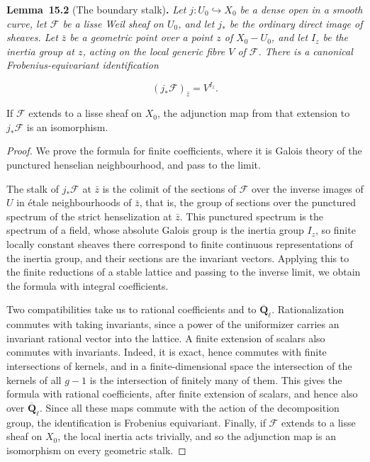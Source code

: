 \documentclass[11pt]{article}
\newenvironment{bpstatement}[2]{\par\addvspace{0.6\baselineskip}\noindent\textbf{#1}#2\textbf{.}\enspace\ignorespaces}
  {\par\addvspace{0.4\baselineskip}}
\newenvironment{bpstatementit}[2]{\begin{bpstatement}{#1}{#2}\itshape\ignorespaces}{\end{bpstatement}}
\begin{document}
\label{bp127}%
\begin{bpstatementit}{Lemma~15.2}{ (The boundary stalk)}
Let \(j:U_0\hookrightarrow X_0\) be a dense open in a smooth curve, let \(\mathcal F\) be a lisse Weil sheaf on \(U_0\), and let \(j_*\) be the ordinary direct image of sheaves. Let \(\bar z\) be a geometric point over a point \(z\) of \(X_0-U_0\), and let \(I_z\) be the inertia group at \(z\), acting on the local generic fibre \(V\) of \(\mathcal F\). There is a canonical Frobenius-equivariant identification

\[
(j_*\mathcal F)_{\bar z}=V^{I_z}.
\]

If \(\mathcal F\) extends to a lisse sheaf on \(X_0\), the adjunction map from that extension to \(j_*\mathcal F\) is an isomorphism.
\end{bpstatementit}

\begin{proof}[{Proof}]\label{bp128}%
We prove the formula for finite coefficients, where it is Galois theory of the punctured henselian neighbourhood, and pass to the limit.

The stalk of \(j_*\mathcal F\) at \(\bar z\) is the colimit of the sections of \(\mathcal F\) over the inverse images of \(U\) in étale neighbourhoods of \(\bar z\), that is, the group of sections over the punctured spectrum of the strict henselization at \(\bar z\). This punctured spectrum is the spectrum of a field, whose absolute Galois group is the inertia group \(I_z\), so finite locally constant sheaves there correspond to finite continuous representations of the inertia group, and their sections are the invariant vectors. Applying this to the finite reductions of a stable lattice and passing to the inverse limit, we obtain the formula with integral coefficients.

Two compatibilities take us to rational coefficients and to \(\overline{\mathbf Q}_\ell\). Rationalization commutes with taking invariants, since a power of the uniformizer carries an invariant rational vector into the lattice.  A finite extension of scalars also commutes with invariants. Indeed, it is exact, hence commutes with finite intersections of kernels, and in a finite-dimensional space the intersection of the kernels of all \(g-1\) is the intersection of finitely many of them. This gives the formula with rational coefficients, after finite extension of scalars, and hence also over \(\overline{\mathbf Q}_\ell\). Since all these maps commute with the action of the decomposition group, the identification is Frobenius equivariant. Finally, if \(\mathcal F\) extends to a lisse sheaf on \(X_0\), the local inertia acts trivially, and so the adjunction map is an isomorphism on every geometric stalk.
\end{proof}
\end{document}
